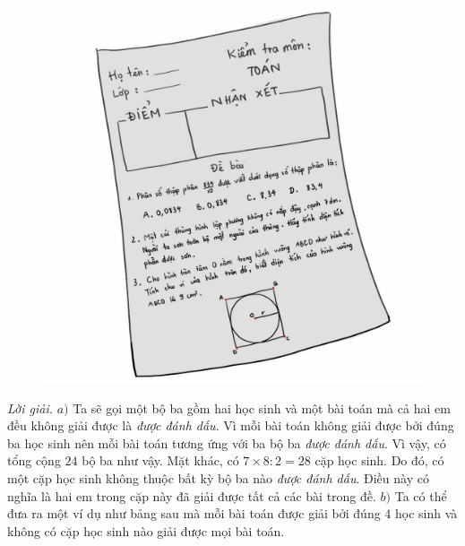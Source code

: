 \begin{multicols}{2}
	\begin{figure}[H]
		\centering
		\vspace*{-10pt}
		\captionsetup{labelformat= empty, justification=centering}
		\includegraphics[width=0.7\linewidth]{Pi4_bai6}
		\vspace*{-5pt}
	\end{figure}
	\textit{Lời giải.} 	$a)$ Ta sẽ gọi một bộ ba gồm hai học sinh và một bài toán mà cả hai em đều không giải được là \textit{được đánh dấu}. Vì mỗi bài toán không giải được bởi đúng ba học sinh nên mỗi bài toán tương ứng với ba bộ ba \textit{được đánh dấu}. Vì vậy, có tổng cộng $24$ bộ ba như vậy. Mặt khác, có $7 \times 8 : 2 = 28$ cặp học sinh. Do đó, có một cặp học sinh không thuộc bất kỳ bộ ba nào \textit{được đánh dấu}. Điều này có nghĩa là hai em trong cặp này đã giải được tất cả các bài trong đề.
	\vskip 0.1cm
	$b)$ Ta có thể đưa ra một ví dụ như bảng sau mà mỗi bài toán được giải bởi đúng $4$ học sinh và không có cặp học sinh nào giải được mọi bài toán.
	\begin{table}[H]
		\renewcommand{\arraystretch}{1.2}
	\end{table}
\end{multicols}
